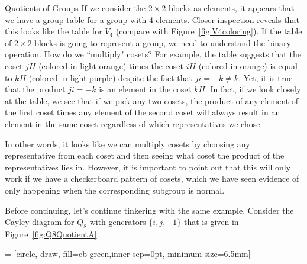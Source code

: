 \begin{section}{Quotients of Groups}
If we consider the $2\times 2$ blocks as elements, it appears that we have a group table for a group with 4 elements.  Closer inspection reveals that this looks like the table for $V_4$ (compare with Figure~\ref{fig:V4coloring}).  If the table of $2\times 2$ blocks is going to represent a group, we need to understand the binary operation.  How do we ``multiply" cosets?  For example, the table suggests that the coset $jH$ (colored in \textcolor{cb-lightorange}{light orange}) times the coset $iH$ (colored in \textcolor{cb-orange}{orange}) is equal to $kH$ (colored in \textcolor{cb-lightpurple}{light purple}) despite the fact that $ji=-k\neq k$.  Yet, it is true that the product $ji=-k$ is an element in the coset $kH$.  In fact, if we look closely at the table, we see that if we pick any two cosets, the product of any element of the first coset times any element of the second coset will always result in an element in the same coset regardless of which representatives we chose.

In other words, it looks like we can multiply cosets by choosing any representative from each coset and then seeing what coset the product of the representatives lies in.  However, it is important to point out that this will only work if we have a checkerboard pattern of cosets, which we have seen evidence of only happening when the corresponding subgroup is normal.

Before continuing, let's continue tinkering with the same example.  Consider the Cayley diagram for $Q_8$ with generators $\{i,j,-1\}$ that is given in Figure~\ref{fig:Q8QuotientA}.

 = [circle, draw, fill=cb-green,inner sep=0pt, minimum size=6.5mm]


\end{section}
